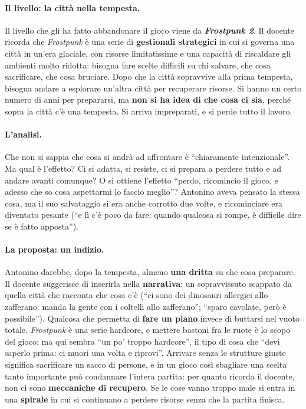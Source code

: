 \paragraph{Il livello: la città nella tempesta.} Il livello che gli ha fatto
abbandonare il gioco viene da \textbf{\emph{Frostpunk 2}}. Il docente ricorda
che \emph{Frostpunk} è una serie di \textbf{gestionali strategici} in cui si
governa una città in un'era glaciale, con risorse limitatissime e una
capacità di riscaldare gli ambienti molto ridotta: bisogna fare scelte
difficili su chi salvare, che cosa sacrificare, che cosa bruciare. Dopo che la
città sopravvive alla prima tempesta, bisogna andare a esplorare un'altra
città per recuperare risorse. Si hanno un certo numero di anni per
prepararsi, ma \textbf{non si ha idea di che cosa ci sia}, perché sopra la
città c'è una tempesta. Si arriva impreparati, e si perde tutto il lavoro.

\paragraph{L'analisi.} Che non si sappia che cosa si andrà ad affrontare è
``chiaramente intenzionale''. Ma qual è l'effetto? Ci si adatta, si resiste,
ci si prepara a perdere tutto e ad andare avanti comunque? O si ottiene
l'effetto ``perdo, ricomincio il gioco, e adesso che so cosa aspettarmi lo
faccio meglio''? Antonino aveva pensato la stessa cosa, ma il suo salvataggio
si era anche corrotto due volte, e ricominciare era diventato pesante (``e lì
c'è poco da fare: quando qualcosa si rompe, è difficile dire se è fatto
apposta'').

\paragraph{La proposta: un indizio.} Antonino darebbe, dopo la tempesta,
almeno \textbf{una dritta} su che cosa preparare. Il docente suggerisce di
inserirla nella \textbf{narrativa}: un sopravvissuto scappato da quella città
che racconta che cosa c'è (``ci sono dei dinosauri allergici allo zafferano:
manda la gente con i coltelli allo zafferano''; ``sparo cavolate, però è
possibile''). Qualcosa che permetta di \textbf{fare un piano} invece di
buttarsi nel vuoto totale. \emph{Frostpunk} è una serie hardcore, e mettere
bastoni fra le ruote è lo scopo del gioco; ma qui sembra ``un po' troppo
hardcore'', il tipo di cosa che ``devi saperlo prima: ci muori una volta e
riprovi''. Arrivare senza le strutture giuste significa sacrificare un sacco
di persone, e in un gioco così sbagliare una scelta tanto importante può
condannare l'intera partita: per quanto ricorda il docente, non ci sono
\textbf{meccaniche di recupero}. Se le cose vanno troppo male si entra in una
\textbf{spirale} in cui si continuano a perdere risorse senza che la partita
finisca.

